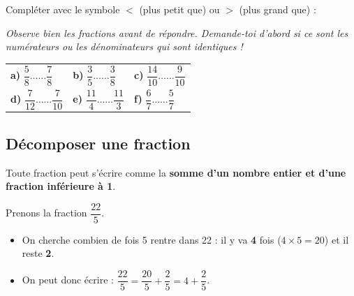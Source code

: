 \documentclass[a4paper]{book}
\begin{document}
    \begin{exemple}        
        Compléter avec le symbole $<$ (plus petit que) ou $>$ (plus grand que) :

        \vspace{0.2cm}
        \textit{Observe bien les fractions avant de répondre. Demande-toi d'abord si ce sont les numérateurs ou les dénominateurs qui sont identiques !}
        
        \begin{center}
            \renewcommand{\arraystretch}{2.5}
            \begin{tabularx}{\textwidth}{>{\centering\arraybackslash}X >{\centering\arraybackslash}X >{\centering\arraybackslash}X}
                \textbf{a)} $\dfrac{5}{8} \dots\dots \dfrac{7}{8}$ & 
                \textbf{b)} $\dfrac{3}{5} \dots\dots \dfrac{3}{8}$ & 
                \textbf{c)} $\dfrac{14}{10} \dots\dots \dfrac{9}{10}$ \\
                \textbf{d)} $\dfrac{7}{12} \dots\dots \dfrac{7}{10}$ & 
                \textbf{e)} $\dfrac{11}{4} \dots\dots \dfrac{11}{3}$ & 
                \textbf{f)} $\dfrac{6}{7} \dots\dots \dfrac{5}{7}$ \\
            \end{tabularx}
        \end{center}
    \end{exemple}


\subsection{Décomposer une fraction}

    \begin{propriete}
        Toute fraction peut s'écrire comme la \textbf{somme d'un nombre entier et d'une fraction inférieure à 1}.        
    \end{propriete}
    
    
    \begin{exemple}
        Prenons la fraction $\dfrac{22}{5}$. 
        \begin{itemize}
            \item On cherche combien de fois 5 rentre dans 22 : il y va \textbf{4} fois ($4 \times 5 = 20$) et il reste \textbf{2}.
            \item On peut donc écrire : $\dfrac{22}{5} = \dfrac{20}{5} + \dfrac{2}{5} = 4 + \dfrac{2}{5}$.
        \end{itemize}
    \end{exemple}
    
\end{document}
